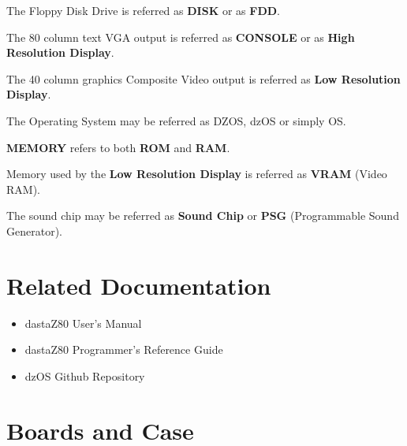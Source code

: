 \documentclass[a4paper,11pt]{article}
\begin{document}
    The Floppy Disk Drive is referred as \textbf{DISK} or as \textbf{FDD}.

    The 80 column text VGA output is referred as \textbf{CONSOLE} or as
    \textbf{High Resolution Display}.

    The 40 column graphics Composite Video output is referred as \textbf{Low
    Resolution Display}.

    The Operating System may be referred as DZOS, dzOS or simply OS.

    \textbf{MEMORY} refers to both \textbf{ROM} and \textbf{RAM}.

    Memory used by the \textbf{Low Resolution Display} is referred as
    \textbf{VRAM} (Video RAM).

    The sound chip may be referred as \textbf{Sound Chip} or \textbf{PSG}
    (Programmable Sound Generator).

    \pagebreak
    \section*{Related Documentation}
    \begin{itemize}
        \item dastaZ80 User's Manual\cite{dastaz80userman}
        \item dastaZ80 Programmer's Reference Guide\cite{dastaz80progref}
        \item dzOS Github Repository\cite{dastaZ80github}
    \end{itemize}

    \pagebreak
    \tableofcontents

    \pagebreak
    \pagestyle{fancy}
    \fancyhf{}
    \fancyfoot[R]{\thepage}
    \setcounter{page}{1}

    \section{Boards and Case}
\end{document}
